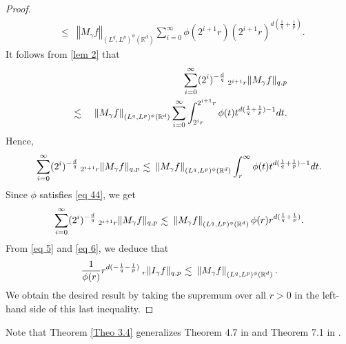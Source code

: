 \documentclass[a4paper,12pt,intlimits,oneside]{amsart}
\numberwithin{equation}{section}
\numberwithin{equation}{section}
\def\lsim{\raisebox{-1ex}{$~\stackrel{\textstyle <}{\sim}~$}}
\theoremstyle{definition}
\begin{document}
\begin{proof}
\begin{eqnarray*}
&\leq& \left\Vert M_{\gamma}f \right\Vert_{(L^{q},L^{p})^{\phi }(\mathbb{R}^{d})} \sum^{\infty}_{i=0} \phi(2^{i+1}r)(2^{i+1}r)^{d(\frac{1}{q}+\frac{1}{p})}.
\end{eqnarray*}
It follows from \eqref{lem 2} that
\begin{eqnarray*}
& &\sum\limits^{\infty}_{i=0} (2^{i})^{-\frac{d}{q}}  \: _{2^{i+1}r}\Vert M_{\gamma}f \Vert_{q,p}\\ 
&\lsim & \left\Vert M_{\gamma}f \right\Vert_{(L^{q},L^{p})^{\phi }(\mathbb{R}^{d})} \sum^{\infty}_{i=0} \displaystyle\int_{2^{i}r}^{2^{i+1}r} \phi(t)t^{d(\frac{1}{q}+\frac{1}{p})-1} dt. 
\end{eqnarray*}
Hence,
$$\sum\limits^{\infty}_{i=0} (2^{i})^{-\frac{d}{q}}  \: _{2^{i+1}r}\Vert M_{\gamma}f \Vert_{q,p}  \lsim  \left\Vert M_{\gamma}f \right\Vert_{(L^{q},L^{p})^{\phi }(\mathbb{R}^{d})} \displaystyle\int_{r}^{\infty} \phi(t)t^{d(\frac{1}{q}+\frac{1}{p})-1} dt.  $$
Since $\phi$ satisfies \eqref{eq 44}, we get 
\begin{equation}\label{eq 6}
\sum\limits^{\infty}_{i=0} (2^{i})^{-\frac{d}{q}}  \: _{2^{i+1}r}\Vert M_{\gamma}f \Vert_{q,p} \lsim  \left\Vert M_{\gamma}f \right\Vert_{(L^{q},L^{p})^{\phi }(\mathbb{R}^{d})}\phi(r)r^{d(\frac{1}{q}+\frac{1}{p})}.
\end{equation}
From \eqref{eq 5} and \eqref{eq 6}, we deduce that 
\begin{equation*} 
\label{eq 7} 
\frac{1}{\phi(r)}r^{d(-\frac{1}{q}-\frac{1}{p})} \: _{r}\Vert I_{\gamma}f \Vert_{q,p} \lsim \left\Vert M_{\gamma}f \right\Vert_{(L^{q},L^{p})^{\phi }(\mathbb{R}^{d})}.
\end{equation*}
We obtain the desired result by taking the supremum over all $ r > 0 $ in
the left-hand side of this last inequality.
\end{proof}
Note that Theorem \ref{Theo 3.4} generalizes Theorem 4.7 in \cite{JF} and Theorem 7.1 in \cite{GoM}.
\end{document}
